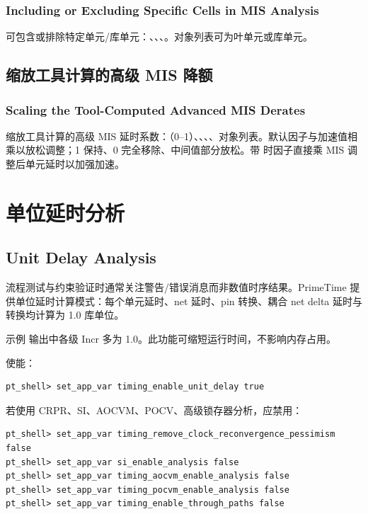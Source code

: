 \subsubsection*{Including or Excluding Specific Cells in MIS Analysis}

 可包含或排除特定单元/库单元：、、、。对象列表可为叶单元或库单元。

\subsection{缩放工具计算的高级 MIS 降额}
\subsubsection*{Scaling the Tool-Computed Advanced MIS Derates}

 缩放工具计算的高级 MIS 延时系数：（0--1）、、、、对象列表。默认因子与加速值相乘以放松调整；1 保持、0 完全移除、中间值部分放松。带  时因子直接乘 MIS 调整后单元延时以加强加速。

\section{单位延时分析}
\subsection*{Unit Delay Analysis}

流程测试与约束验证时通常关注警告/错误消息而非数值时序结果。PrimeTime 提供单位延时计算模式：每个单元延时、net 延时、pin 转换、耦合 net delta 延时与转换均计算为 1.0 库单位。

示例  输出中各级 Incr 多为 1.0。此功能可缩短运行时间，不影响内存占用。

使能：
\begin{lstlisting}
pt_shell> set_app_var timing_enable_unit_delay true
\end{lstlisting}

若使用 CRPR、SI、AOCVM、POCV、高级锁存器分析，应禁用：
\begin{lstlisting}
pt_shell> set_app_var timing_remove_clock_reconvergence_pessimism false
pt_shell> set_app_var si_enable_analysis false
pt_shell> set_app_var timing_aocvm_enable_analysis false
pt_shell> set_app_var timing_pocvm_enable_analysis false
pt_shell> set_app_var timing_enable_through_paths false
\end{lstlisting}

